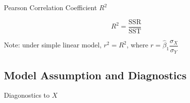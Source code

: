\begin{point}
    Pearson Correlation Coefficient $ R^2 $
\end{point}

\[
    R^2=\dfrac{\mathrm{SSR}}{\mathrm{SST}} 
\]

    Note: under simple linear model, $ r^2=R^2 $, where $ r=\hat{\beta}_1\dfrac{\sigma _X}{\sigma _Y} $



\subsection{Model Assumption and Diagnostics}
    
\begin{point}
    Diagonostics to $ X $
\end{point}


